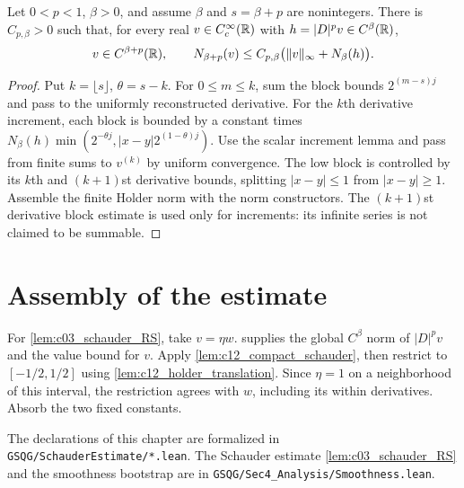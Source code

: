 \begin{lemma}
  \label{lem:c12_compact_schauder}
  Let $0<p<1$, $\beta>0$, and assume $\beta$ and $s=\beta+p$ are nonintegers.
  There is $C_{p,\beta}>0$ such that, for every real $v\in C_c^\infty(\mathbb{R})$ with
  $h=|D|^pv\in C^\beta(\mathbb{R})$,
  \[
    v\in C^{\beta+p}(\mathbb{R}),\qquad
    N_{\beta+p}(v)\le C_{p,\beta}\bigl(\|v\|_\infty+N_\beta(h)\bigr).
  \]
\end{lemma}
\begin{proof}
  Put $k=\lfloor s\rfloor$, $\theta=s-k$. For $0\le m\le k$, sum the block bounds
  $2^{(m-s)j}$ and pass to the uniformly reconstructed derivative.
  For the $k$th derivative increment, each block is bounded by a constant times
  $N_\beta(h)\min(2^{-\theta j},|x-y|2^{(1-\theta)j})$.
  Use the scalar increment lemma and pass from finite sums to $v^{(k)}$ by uniform convergence.
  The low block is controlled by its $k$th and $(k+1)$st derivative bounds, splitting
  $|x-y|\le1$ from $|x-y|\ge1$. Assemble the finite Holder norm with the norm constructors.
  The $(k+1)$st derivative block estimate is used only for increments: its infinite series
  is not claimed to be summable.
\end{proof}

\section{Assembly of the estimate}

For \cref{lem:c03_schauder_RS}, take $v=\eta w$.
 supplies the global $C^\beta$ norm of $|D|^pv$ and the value bound
for $v$. Apply \cref{lem:c12_compact_schauder}, then restrict to $[-1/2,1/2]$ using
\cref{lem:c12_holder_translation}. Since $\eta=1$ on a neighborhood of this interval,
the restriction agrees with $w$, including its within derivatives. Absorb the two fixed constants.

\begin{remark}
  The declarations of this chapter are formalized in \texttt{GSQG/SchauderEstimate/*.lean}.
  The Schauder estimate \cref{lem:c03_schauder_RS} and the smoothness bootstrap
  are in \texttt{GSQG/Sec4\_Analysis/Smoothness.lean}.
\end{remark}
